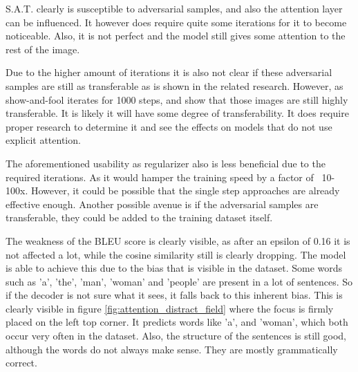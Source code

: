 S.A.T. clearly is susceptible to adversarial samples, and also the attention layer can be influenced. It however does require quite some iterations for it to become noticeable. Also, it is not perfect and the model still gives some attention to the rest of the image.

Due to the higher amount of iterations it is also not clear if these adversarial samples are still as transferable as is shown in the related research. However, as show-and-fool\cite{Hongge} iterates for 1000 steps, and show that those images are still highly transferable. It is likely it will have some degree of transferability. It does require proper research to determine it and see the effects on models that do not use explicit attention.

The aforementioned usability as regularizer also is less beneficial due to the required iterations. As it would hamper the training speed by a factor of ~10-100x. However, it could be possible that the single step approaches are already effective enough. Another possible avenue is if the adversarial samples are transferable, they could be added to the training dataset itself.

The weakness of the BLEU score is clearly visible, as after an epsilon of 0.16 it is not affected a lot, while the cosine similarity still is clearly dropping. The model is able to achieve this due to the bias that is visible in the dataset. Some words such as 'a', 'the', 'man', 'woman' and 'people' are present in a lot of sentences. So if the decoder is not sure what it sees, it falls back to this inherent bias. This is clearly visible in figure \ref{fig:attention_distract_field} where the focus is firmly placed on the left top corner. It predicts words like 'a', and 'woman', which both occur very often in the dataset. Also, the structure of the sentences is still good, although the words do not always make sense. They are mostly grammatically correct.
